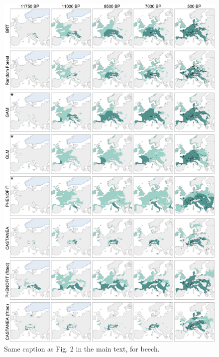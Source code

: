 \documentclass[pdflatex, sn-nature, oneside]{sn-jnl}%
\begin{document}
\begin{figure}
\hspace*{-0.3in}
\centering
\includegraphics{fagus_simulations-1.pdf}
\caption{Same caption as Fig. 2 in the main text, for beech.}
\end{figure}
\end{document}
